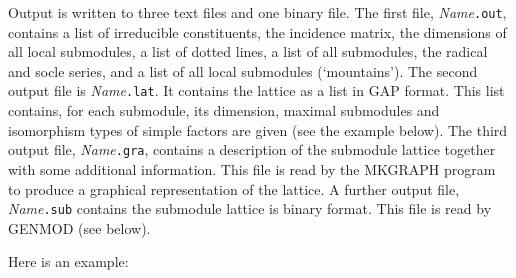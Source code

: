 Output is written to three text files and one binary file. The first
file,
{\it Name}{\tt .out}, contains a list of irreducible constituents, the
incidence matrix, the dimensions of all local submodules, a list of
dotted lines, a list of all submodules, the radical and socle series,
and a list of all local submodules (`mountains').
The second output file is {\it Name}{\tt .lat}. It contains
the lattice as a list in GAP format. This list contains, for each
submodule, its dimension, maximal submodules and isomorphism types
of simple factors are given (see the example below).
The third output file, {\it Name}{\tt .gra}, contains a description
of the submodule lattice
together with some additional information. This file is read by the
MKGRAPH program to produce a graphical representation of the lattice.
A further output file, {\it Name}{\tt.sub} contains the
submodule lattice is binary format. This file is read by
GENMOD (see below).



Here is an example:

